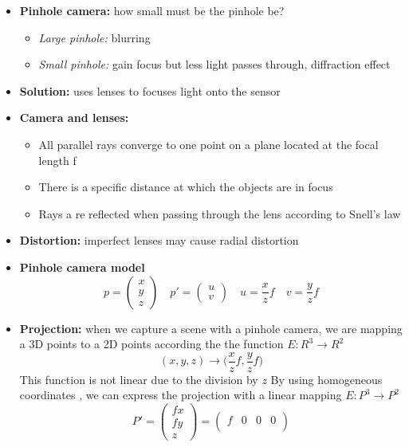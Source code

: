 \documentclass{article}
\begin{document}
\begin{itemize}
\begin{itemize}
        \item \textbf{Pinhole camera:} how small must be the pinhole be?
        \begin{itemize}
            \item \textit{Large pinhole:} blurring
            \item \textit{Small pinhole:} gain focus but less light passes through, diffraction effect
        \end{itemize}
        \item \textbf{Solution:} uses lenses to focuses light onto the sensor
        \item \textbf{Camera and lenses:}
        \begin{itemize}
            \item All parallel rays converge to one point on a plane located at the focal length f
            \item There is a specific distance at which the objects are in focus
            \item Rays a re reflected when passing through the lens according to Snell's law
        \end{itemize}
        \item \textbf{Distortion:} imperfect lenses may cause radial distortion
        \item \textbf{Pinhole camera model}
        \[p=\begin{pmatrix}x \\ y\\ z\end{pmatrix} \quad p'= \begin{pmatrix}u\\ v \end{pmatrix} \quad u = \frac{x}{z}f \quad v = \frac{y}{z}f\]
        \item \textbf{Projection:} when we capture a scene with a pinhole camera, we are mapping a 3D points to a 2D points according the the function \(E: R^3 \rightarrow R^2\)
        \[(x,y,z) \rightarrow \Big(\frac{x}{z}f, \frac{y}{z}f\Big)\]
        This function is not linear due to the division by \(z\)
        By using homogeneous coordinates , we can express the projection with a linear mapping \(E: P^3 \rightarrow P^2\)
        \[P' = \begin{pmatrix}
            fx \\ fy \\ z
        \end{pmatrix} = \begin{pmatrix}
            f & 0 & 0 & 0\\

\end{pmatrix}\]
\end{itemize}
\end{itemize}
\end{document}
